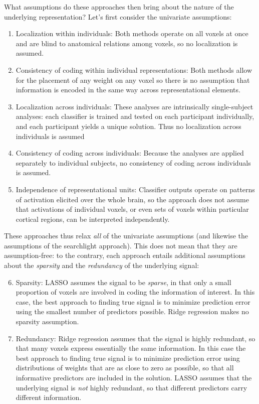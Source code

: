 What assumptions do these approaches then bring about the nature of the underlying representation? Let's first consider the univariate assumptions: 

\begin{enumerate}
\item Localization within individuals: Both methods operate on all voxels at once and are blind to anatomical relations among voxels, so no localization is assumed.

\item Consistency of coding within individual representations: Both methods allow for the placement of any weight on any voxel so there is no assumption that information is encoded in the same way across representational elements.

\item Localization across individuals: These analyses are intrinsically single-subject analyses: each classifier is trained and tested on each participant individually, and each participant yields a unique solution. Thus no localization across individuals is assumed

\item Consistency of coding across individuals: Because the analyses are applied separately to individual subjects, no consistency of coding across individuals is assumed.

\item Independence of representational units: Classifier outputs operate on patterns of activation elicited over the whole brain, so the approach does not assume that activations of individual voxels, or even sets of voxels within particular cortical regions, can be interpreted independently.
\end{enumerate}

These approaches thus relax {\em all} of the univariate assumptions (and likewise the assumptions of the searchlight approach). This does not mean that they are assumption-free: to the contrary, each approach entails additional assumptions about the {\em sparsity} and the {\em redundancy} of the underlying signal:

\begin{enumerate}
\setcounter{enumi}{5}
\item Sparsity: LASSO assumes the signal to be {\em sparse}, in that only a small proportion of voxels are involved in coding the information of interest. In this case, the best approach to finding true signal is to minimize prediction error using the smallest number of predictors possible. Ridge regression makes no sparsity assumption.

\item Redundancy: Ridge regression assumes that the signal is highly redundant, so that many voxels express essentially the same information. In this case the best approach to finding true signal is to minimize prediction error using distributions of weights that are as close to zero as possible, so that all informative predictors are included in the solution. LASSO assumes that the underlying signal is {\em not} highly redundant, so that different predictors carry different information.
\end{enumerate}

